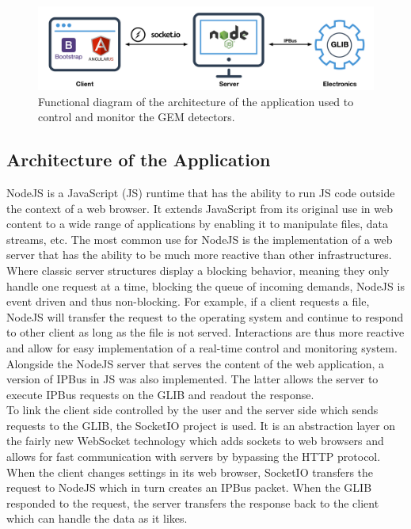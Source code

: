     \begin{figure}[h!]
      \centering
      \includegraphics[width=\textwidth]{img/II-3-test-beam/app-layout.png}
      \caption{Functional diagram of the architecture of the application used to control and monitor the GEM detectors.}
      \label{fig:II-3-app-layout}
    \end{figure}

    \subsection{Architecture of the Application}

      NodeJS is a JavaScript (JS) runtime that has the ability to run JS code outside the context of a web browser. It extends JavaScript from its original use in web content to a wide range of applications by enabling it to manipulate files, data streams, etc. The most common use for NodeJS is the implementation of a web server that has the ability to be much more reactive than other infrastructures. Where classic server structures display a blocking behavior, meaning they only handle one request at a time, blocking the queue of incoming demands, NodeJS is event driven and thus non-blocking. For example, if a client requests a file, NodeJS will transfer the request to the operating system and continue to respond to other client as long as the file is not served. Interactions are thus more reactive and allow for easy implementation of a real-time control and monitoring system. Alongside the NodeJS server that serves the content of the web application, a version of IPBus in JS was also implemented. The latter allows the server to execute IPBus requests on the GLIB and readout the response. \\

      To link the client side controlled by the user and the server side which sends requests to the GLIB, the SocketIO project is used. It is an abstraction layer on the fairly new WebSocket technology which adds sockets to web browsers and allows for fast communication with servers by bypassing the HTTP protocol. When the client changes settings in its web browser, SocketIO transfers the request to NodeJS which in turn creates an IPBus packet. When the GLIB responded to the request, the server transfers the response back to the client which can handle the data as it likes. \\

